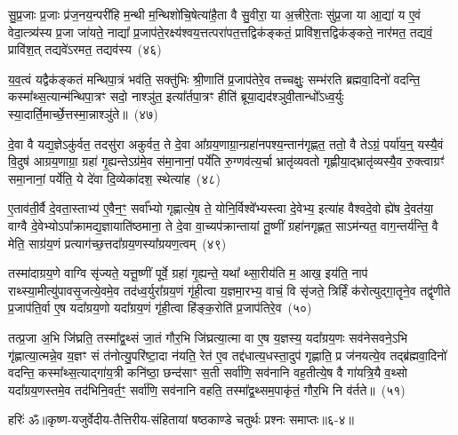 सु॒प्र॒जाः प्र॒जाः प्र॑ज॒नय॒न्परी॑हि म॒न्थी म॒न्थिशो॑चि॒षेत्या॑है॒ता वै सु॒वीरा॒ या अ॒त्त्रीरे॒ताः सु॑प्र॒जा या आ॒द्या॑ य ए॒वं वेदा॒त्त्र्य॑स्य प्र॒जा जा॑यते॒ नाद्या᳚ प्र॒जा\-प॑ते॒रक्ष्य॑श्वय॒त्तत्परा॑पत॒त्तद्विक॑ङ्कतं॒ प्रावि॑श॒त्तद्विक॑ङ्कते॒ नार॑मत॒ तद्यवं॒ प्रावि॑श॒त् तद्यवे॑\-ऽरमत॒ तद्यव॑स्य~(४६)\ip

य॒व॒त्वं यद्वैक॑ङ्कतं मन्थिपा॒त्रं भव॑ति॒ सक्तु॑भिः श्री॒णाति॑ प्र॒जा\-प॑तेरे॒व तच्चक्षुः॒ सम्भ॑रति ब्रह्मवा॒दिनो॑ वदन्ति॒ कस्मा᳚थ्स॒त्यान्म॑न्थिपा॒त्रꣳ सदो॒ नाश्ञु॑त॒ इत्या᳚र्तपा॒त्रꣳ हीति॑ ब्रूया॒द्यद॑श्ञुवी॒तान्धो᳚\-ऽध्व॒र्युः स्या॒दार्ति॒मार्च्छे॒त्तस्मा॒न्नाश्ञु॑ते॥~(४७)\ip

{\anuvakamend[{आ॒त्मना॒ परा॒ निष्प्र शु॒क्रशो॑चिषा॒ यव॑स्य स॒प्तत्रिꣳ॑शच्च}]}%

दे॒वा वै यद्य॒ज्ञे\-ऽकु॑र्वत॒ तदसु॑रा अकुर्वत॒ ते दे॒वा आ᳚ग्रय॒णाग्रा॒न्ग्रहा॑नपश्य॒न्तान॑गृह्णत॒ ततो॒ वै ते\-ऽग्रं॒ पर्या॑य॒न्॒ यस्यै॒वं वि॒दुष॑ आग्रय॒णाग्रा॒ ग्रहा॑ गृ॒ह्यन्ते\-ऽग्र॑मे॒व स॑मा॒नानां॒ पर्ये॑ति रु॒ग्णव॑त्य॒र्चा भ्रातृ॑व्यवतो गृह्णीया॒द्भ्रातृ॑व्यस्यै॒व रु॒क्त्वाग्रꣳ॑ समा॒नानां॒ पर्ये॑ति॒ ये दे॑वा दि॒व्येका॑\-दश॒ स्थेत्या॑ह~(४८)\ip

ए॒ताव॑ती॒र्वै दे॒वता॒स्ताभ्य॑ ए॒वैन॒ꣳ॒ सर्वा᳚भ्यो गृह्णात्ये॒ष ते॒ योनि॒र्विश्वे᳚भ्यस्त्वा दे॒वेभ्य॒ इत्या॑ह वैश्वदे॒वो ह्ये॑ष दे॒वत॑या॒ वाग्वै दे॒वेभ्यो\-ऽपा᳚क्रामद्य॒ज्ञायाति॑ष्ठमाना॒ ते दे॒वा वा॒च्यप॑क्रान्तायां तू॒ष्णीं ग्रहा॑नगृह्णत॒ सा\-ऽम॑न्यत॒ वाग॒न्तर्य॑न्ति॒ वै मेति॒ साग्र॑य॒णं प्रत्याग॑च्छ॒त्तदा᳚ग्रय॒णस्या᳚ग्रयण॒त्वम्~(४९)\ip

तस्मा॑दाग्रय॒णे वाग्वि सृ॑ज्यते॒ यत्तू॒ष्णीं पूर्वे॒ ग्रहा॑ गृ॒ह्यन्ते॒ यथा᳚ थ्सा॒रीय॑ति म॒ आख॒ इय॑ति॒ नाप॑ राथ्स्या॒मीत्यु॑पावसृ॒जत्ये॒वमे॒व तद॑ध्व॒र्युरा᳚ग्रय॒णं गृ॑ही॒त्वा य॒ज्ञमा॒रभ्य॒ वाचं॒ वि सृ॑जते॒ त्रिर्\mbox{}हिं क॑रोत्युद्गा॒तॄने॒व तद्वृ॑णीते प्र॒जा\-प॑ति॒र्वा ए॒ष यदा᳚ग्रय॒णो यदा᳚ग्रय॒णं गृ॑ही॒त्वा हि॑ङ्क॒रोति॑ प्र॒जा\-प॑तिरे॒व~(५०)\ip

तत्प्र॒जा अ॒भि जि॑घ्रति॒ तस्मा᳚द्\-व॒थ्सं जा॒तं गौर॒भि जि॑घ्रत्या॒त्मा वा ए॒ष य॒ज्ञस्य॒ यदा᳚ग्रय॒णः सव॑नेसवने॒\-ऽभि गृ॑ह्णात्या॒त्मन्ने॒व य॒ज्ञꣳ सं त॑नोत्यु॒परि॑ष्टा॒दा न॑यति॒ रेत॑ ए॒व तद्द॑धात्य॒धस्ता॒दुप॑ गृह्णाति॒ प्र ज॑नयत्ये॒व तद्ब्र॑ह्मवा॒दिनो॑ वदन्ति॒ कस्मा᳚थ्स॒त्याद्गा॑य॒त्री कनि॑ष्ठा॒ छन्द॑साꣳ स॒ती सर्वा॑णि॒ सव॑नानि वह॒तीत्ये॒ष वै गा॑यत्रि॒यै व॒थ्सो यदा᳚ग्रय॒णस्तमे॒व तद॑भिनि॒वर्त॒ꣳ॒ सर्वा॑णि॒ सव॑नानि वहति॒ तस्मा᳚द्\-व॒थ्सम॒पाकृ॑तं॒ गौर॒भि नि व॑र्तते॥~(५१)\ip

{\anuvakamend[{आ॒हा॒ग्र॒य॒ण॒त्वं प्र॒जा\-प॑तिरे॒वेति॑ विꣳश॒तिश्च॑}]}%

{हरिः॑ ॐ}{॥कृष्ण-यजुर्वेदीय-तैत्तिरीय-संहितायां षष्ठकाण्डे चतुर्थः प्रश्नः समाप्तः॥६-४॥}


